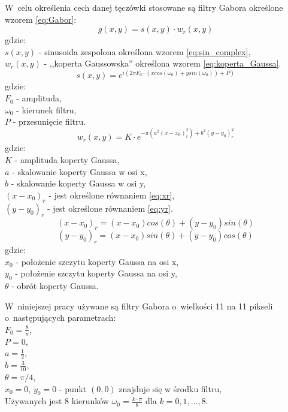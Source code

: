 W~celu określenia cech danej tęczówki stosowane są filtry Gabora określone wzorem \ref{eq:Gabor}:
\begin{equation}
\label{eq:Gabor}
g(x,y) = s(x,y)\cdot w_{r}(x,y)
\end{equation}
gdzie:\\
$s(x,y)$ - sinusoida zespolona określona wzorem \ref{eq:sin_complex},\\
$w_{r}(x,y)$ - ,,koperta Gaussowska'' określona wzorem \ref{eq:koperta_Gaussa}.\\
\begin{equation}
\label{eq:sin_complex}
s(x,y) = e^{i(2 \pi F_{0} \cdot (xcos(\omega_{0}) + ysin(\omega_{0})) + P)}
\end{equation}
gdzie:\\
$F_{0}$ - amplituda,\\
$\omega_{0}$ - kierunek filtru,\\
$P$ - przesunięcie filtru.\\
\begin{equation}
\label{eq:koperta_Gaussa}
w_{r}(x,y) = K \cdot e^{-\pi(a^{2}(x-x_{0})_{r}^{2}) + b^{2}(y-y_{0})_{r}^{2}}
\end{equation}
gdzie:\\
$K$ - amplituda koperty Gaussa,\\
$a$ - skalowanie koperty Gaussa w osi x,\\
$b$ - skalowanie koperty Gaussa w osi y,\\
$(x-x_{0})_{r}$ - jest określone równaniem \ref{eq:xr},\\
$(y-y_{0})_{r}$ - jest określone równaniem \ref{eq:yr}.\\
\begin{equation}
\label{eq:xr}
(x-x_{0})_{r} = (x-x_{0})cos(\theta)+(y-y_{0})sin(\theta)
\end{equation}
\begin{equation}
\label{eq:yr}
(y-y_{0})_{r} = (x-x_{0})sin(\theta)+(y-y_{0})cos(\theta)
\end{equation}
gdzie:\\
$x_{0}$ - położenie szczytu koperty Gaussa na osi x,\\
$y_{0}$ - położenie szczytu koperty Gaussa na osi y,\\
$\theta$ - obrót koperty Gaussa.

W~niniejszej pracy używane są filtry Gabora o~wielkości 11 na 11 pikseli o~następujących parametrach:\\
$F_{0} = \frac{8}{\pi}$,\\
$P = 0$,\\
$a = \frac{1}{2}$,\\
$b = \frac{3}{10}$,\\
$\theta = \pi / 4$,\\
$x_{0} = 0$, $y_{0} = 0$ - punkt $(0,0)$ znajduje się w środku filtru,\\
Używanych jest 8 kierunków $\omega_{0} =\frac {k \cdot \pi} {8} $ dla $k = 0, 1, ..., 8$.

